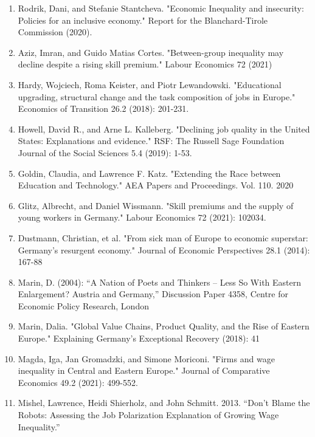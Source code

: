 \documentclass{article}
\begin{document}
\begin{enumerate}
\item Rodrik, Dani, and Stefanie Stantcheva. "Economic Inequality and insecurity: Policies for an inclusive economy." Report for the Blanchard-Tirole Commission (2020).

\item Aziz, Imran, and Guido Matias Cortes. "Between-group inequality may decline despite a rising skill premium." Labour Economics 72 (2021)

\item Hardy, Wojciech, Roma Keister, and Piotr Lewandowski. "Educational upgrading, structural change and the task composition of jobs in Europe." Economics of Transition 26.2 (2018): 201-231.

\item Howell, David R., and Arne L. Kalleberg. "Declining job quality in the United States: Explanations and evidence." RSF: The Russell Sage Foundation Journal of the Social Sciences 5.4 (2019): 1-53.

\item Goldin, Claudia, and Lawrence F. Katz. "Extending the Race between Education and Technology." AEA Papers and Proceedings. Vol. 110. 2020

\item Glitz, Albrecht, and Daniel Wissmann. "Skill premiums and the supply of young workers in Germany." Labour Economics 72 (2021): 102034.

\item Dustmann, Christian, et al. "From sick man of Europe to economic superstar: Germany's resurgent economy." Journal of Economic Perspectives 28.1 (2014): 167-88

\item Marin, D. (2004): “A Nation of Poets and Thinkers – Less So With Eastern Enlargement? Austria and Germany,” Discussion Paper 4358, Centre for Economic Policy Research, London

\item Marin, Dalia. "Global Value Chains, Product Quality, and the Rise of Eastern Europe." Explaining Germany’s Exceptional Recovery (2018): 41

\item Magda, Iga, Jan Gromadzki, and Simone Moriconi. "Firms and wage inequality in Central and Eastern Europe." Journal of Comparative Economics 49.2 (2021): 499-552.

\item Mishel, Lawrence, Heidi Shierholz, and John Schmitt. 2013. “Don’t Blame the Robots: Assessing the Job Polarization Explanation of Growing Wage Inequality.”


\end{enumerate}
\end{document}
